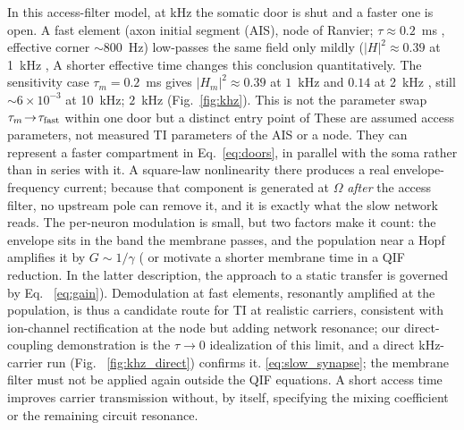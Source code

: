 \documentclass[11pt,a4paper]{article}
\providecommand{\DIFaddtex}[1]{{\protect\color{blue} \sf #1}} %
\providecommand{\DIFdeltex}[1]{{\protect\color{red} \scriptsize #1}} %
\providecommand{\DIFaddbegin}{} %
\providecommand{\DIFaddend}{} %
\providecommand{\DIFdelbegin}{} %
\providecommand{\DIFdelend}{} %
\providecommand{\DIFadd}[1]{\texorpdfstring{\DIFaddtex{#1}}{#1}} %
\providecommand{\DIFdel}[1]{\texorpdfstring{\DIFdeltex{#1}}{}} %
\begin{document}
\DIFdel{In this access-filter model, at kHz the somatic door is shut and a faster one is open. A fast element (axon initial segment (AIS),
node of Ranvier; $\tau\!\approx\!0.2$~ms , effective corner $\sim$800~Hz) low-passes the same field only
mildly ($|H|^2\!\approx\!0.39$ at 1~kHz , }\DIFdelend \DIFaddbegin \DIFadd{A shorter effective time changes this conclusion quantitatively. The sensitivity
case $\tau_m=0.2$~ms gives $|H_m|^2\approx0.39$ at $1$~kHz and }\DIFaddend $0.14$ at \DIFdelbegin \DIFdel{2~kHz
, still $\sim 6\times10^{-3}$ at 10~kHz;
}\DIFdelend \DIFaddbegin \DIFadd{$2$~kHz
(}\DIFaddend Fig.~\ref{fig:khz}). \DIFdelbegin \DIFdel{This is not the parameter swap $\tau_m\!\to\!\tau_{\rm fast}$ within one door but a distinct entry point of }\DIFdelend \DIFaddbegin \DIFadd{These are assumed access parameters, not measured TI
parameters of the AIS or a node. They can represent a faster compartment in
}\DIFaddend Eq.~\eqref{eq:doors}, \DIFdelbegin \DIFdel{in parallel with the soma rather than in series with it. A
square-law nonlinearity there produces a real envelope-frequency current; because that component is
generated at $\Omega$ \emph{after} the access filter, no upstream pole can remove it, and it is exactly
what the slow network reads.
The per-neuron modulation is small, but two factors make it count: the envelope sits in the band the membrane passes, and the population near a Hopf amplifies it by
$G\!\sim\!1/\gamma$ (}\DIFdelend \DIFaddbegin \DIFadd{or motivate a shorter membrane time in a QIF reduction.
In the latter description, the approach to a static transfer is governed by
}\DIFaddend Eq.~\DIFdelbegin \DIFdel{\eqref{eq:gain}). Demodulation at fast elements,
resonantly amplified at
the population, is thus a candidate route for TI at realistic carriers, consistent
with ion-channel rectification at the node \cite{mirzakhalili2020} but adding network
resonance; our direct-coupling demonstration is the $\tau\!\to\!0$ idealization of
this limit, and a direct kHz-carrier run (Fig.
~\ref{fig:khz_direct}) confirms it.
}\DIFdelend \DIFaddbegin \DIFadd{\eqref{eq:slow_synapse}; the membrane filter must not be applied again outside
the QIF equations. A short access time improves carrier transmission without,
by itself, specifying the mixing coefficient or the remaining circuit resonance.
}\DIFaddend
\end{document}
